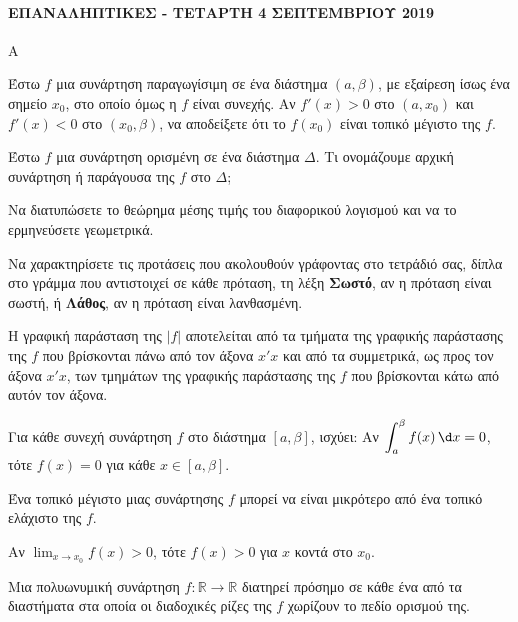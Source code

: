 \paragraph{ΕΠΑΝΑΛΗΠΤΙΚΕΣ - ΤΕΤΑΡΤΗ 4 ΣΕΠΤΕΜΒΡΙΟΥ 2019}
\begin{thema}{Α}
\begin{erwthma}
    \item Έστω $f$ μια συνάρτηση παραγωγίσιμη σε ένα διάστημα $(a, \beta)$, με εξαίρεση ίσως ένα σημείο $x_0$, στο οποίο όμως η $f$ είναι συνεχής. Αν $f'(x) > 0$ στο $(a, x_0)$ και $f'(x) < 0$ στο $(x_0, \beta)$, να αποδείξετε ότι το $f(x_0)$ είναι τοπικό μέγιστο της $f$. 
    \item Έστω $f$ μια συνάρτηση ορισμένη σε ένα διάστημα $\Delta$. Τι ονομάζουμε αρχική συνάρτηση ή παράγουσα της $f$ στο $\Delta$; 
    \item Να διατυπώσετε το θεώρημα μέσης τιμής του διαφορικού λογισμού και να το ερμηνεύσετε γεωμετρικά. 
    \item Να χαρακτηρίσετε τις προτάσεις που ακολουθούν γράφοντας στο τετράδιό σας, δίπλα στο γράμμα που αντιστοιχεί σε κάθε πρόταση, τη λέξη \textbf{Σωστό}, αν η πρόταση είναι σωστή, ή \textbf{Λάθος}, αν η πρόταση είναι λανθασμένη.
    \begin{alist}
        \item Η γραφική παράσταση της $|f|$ αποτελείται από τα τμήματα της γραφικής παράστασης της $f$ που βρίσκονται πάνω από τον άξονα $x'x$ και από τα συμμετρικά, ως προς τον άξονα $x'x$, των τμημάτων της γραφικής παράστασης της $f$ που βρίσκονται κάτω από αυτόν τον άξονα.
        \item Για κάθε συνεχή συνάρτηση $f$ στο διάστημα $[a, \beta]$, ισχύει: Αν $\displaystyle\int_{a}^{\beta} f(x)\,\d x = 0$, τότε $f(x) = 0$ για κάθε $x \in [a, \beta]$.
        \item Ένα τοπικό μέγιστο μιας συνάρτησης $f$ μπορεί να είναι μικρότερο από ένα τοπικό ελάχιστο της $f$.
        \item Αν $\displaystyle\lim_{x \to x_0} f(x) > 0$, τότε $f(x) > 0$ για $x$ κοντά στο $x_0$.
        \item Μια πολυωνυμική συνάρτηση $f : \mathbb{R} \to \mathbb{R}$ διατηρεί πρόσημο σε κάθε ένα από τα διαστήματα στα οποία οι διαδοχικές ρίζες της $f$ χωρίζουν το πεδίο ορισμού της.
    \end{alist} 
\end{erwthma}
\end{thema}
